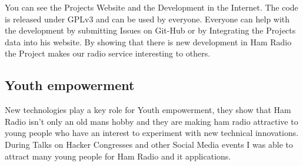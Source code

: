 \documentclass{article}
\begin{document}
You can see the Projects Website and the Development in the Internet. The 
code is released under GPLv3 and can be used by everyone. Everyone can help 
with the development by submitting Issues on Git-Hub or by Integrating the 
Projects data into his website. By showing that there is new development in Ham 
Radio the Project makes our radio service interesting to others.


\subsection{Youth empowerment}

New technologies play a key role for Youth empowerment, they show that Ham Radio 
isn't only an old mans hobby and they are making ham radio attractive to young people 
who have an interest to experiment with new technical innovations. During Talks on 
Hacker Congresses and other Social Media events I was able to attract many young 
people for Ham Radio and it applications. 
\end{document}
